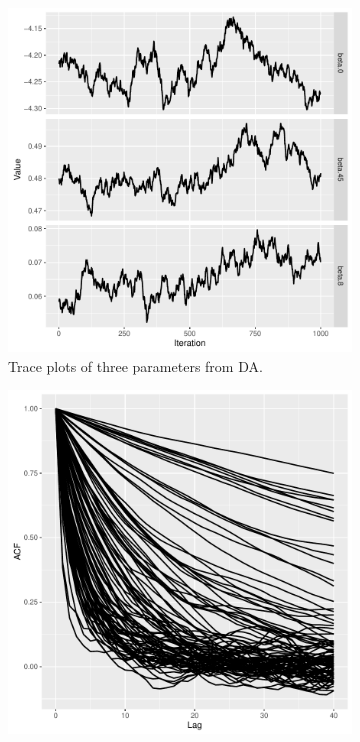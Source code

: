 \documentclass[10pt]{article}
\begin{document}
 \begin{figure}[H]
   \begin{subfigure}[b]{0.45\textwidth}
 \includegraphics[width=1\textwidth]{traceplot_poisson_da}
 \caption{Trace plots of three parameters from DA.}
  \label{traceplot_poi_da}
 \end{subfigure}
  \hfill 
 \begin{subfigure}[b]{0.45\textwidth}
 \includegraphics[width=1\textwidth]{poisson_da_acf.pdf}

\end{subfigure}
\end{figure}
\end{document}
